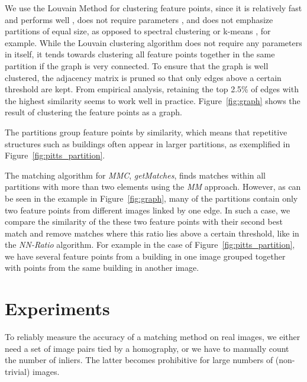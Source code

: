 \documentclass[conference]{IEEEtran}
\begin{document}
We use the Louvain Method \cite{blondel2008} for clustering feature 
points, since it is relatively fast and performs 
well \cite{lancichinetti2009}, does not require 
parameters \cite{blondel2008}, and does not emphasize partitions of equal 
size, as opposed to spectral clustering or 
k-means \cite{von2007}, for example.
While the Louvain clustering algorithm does not require any parameters in 
itself, it tends towards clustering all feature points together in the 
same partition if the graph is very connected.  To ensure that the graph 
is well clustered, the adjacency matrix is pruned so that only edges above a 
certain threshold are kept. From empirical analysis, retaining the top 
2.5\% of edges with the highest similarity seems to work well in 
practice. Figure~\ref{fig:graph} shows the result of clustering the 
feature points as a graph.

The partitions group feature points by similarity, which means that 
repetitive structures such as buildings often appear in larger 
partitions, as exemplified in Figure~\ref{fig:pitts_partition}.

The matching algorithm for \emph{MMC}, \emph{getMatches}, finds matches 
within all partitions with more than two elements using the \emph{MM} 
approach.  However, as can be seen in the example in 
Figure~\ref{fig:graph}, many of the partitions contain only two feature 
points from different images linked by one edge. In such a case, we 
compare the similarity of the these two feature points with their second 
best match and remove matches where this ratio lies above a certain 
threshold, like in the \emph{NN-Ratio} algorithm. For example in the 
case of Figure~\ref{fig:pitts_partition}, we have several feature points 
from a building in one image grouped together with points from the same 
building in another image.
%
\section{Experiments}
\label{S:Experiments}
%
To reliably measure the accuracy of a matching method on real images, we 
either need a set of image pairs tied by a homography, or we have to manually count 
the number of inliers. The latter becomes prohibitive for large numbers of (non-trivial) images. 
\end{document}
